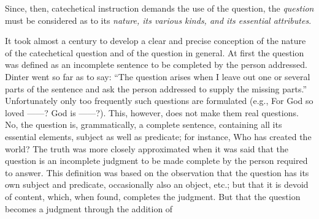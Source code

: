 Since, then, catechetical instruction demands the use of the question, the \emph{question} must be considered as to its \emph{nature, its various kinds, and its essential attributes}.

It took almost a century to develop a clear and precise conception of the nature of the catechetical question and of the question in general. At first the question was defined as an incomplete sentence to be completed by the person addressed. Dinter went so far as to say: “The question arises when I leave out one or several parts of the sentence and ask the person addressed to supply the missing parts.” Unfortunately only too frequently such questions are formulated (e.g., For God so loved ——? God is ——?). This, however, does not make them real questions. No, the question is, grammatically, a complete sentence, containing all its essential elements, subject as well as predicate; for instance, Who has created the world? The truth was more closely approximated when it was said that the question is an incomplete judgment to be made complete by the person required to answer. This definition was based on the observation that the question has its own subject and predicate, occasionally also an object, etc.; but that it is devoid of content, which, when found, completes the judgment. But that the question becomes a judgment through the addition of
